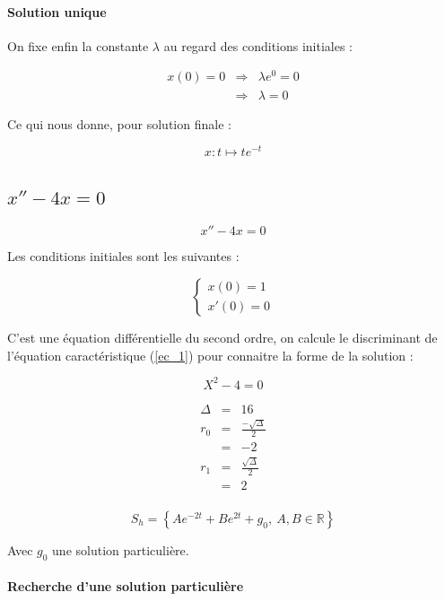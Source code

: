 \documentclass[a4paper, 11pt]{report} %
\newcommand{\R}{\mathbb{R}}
\renewcommand{\mapsto}{\longmapsto}
\begin{document}
\paragraph{Solution unique}
On fixe enfin la constante $\lambda$ au regard des conditions initiales :

\begin{eqnarray*}
    x(0) = 0 & \Rightarrow & \lambda e^0 = 0\\
    & \Rightarrow & \lambda = 0
\end{eqnarray*}

Ce qui nous donne, pour solution finale :

\[
x : t \mapsto te^{-t}
\]
\subsection{$x'' - 4x = 0$} %

\begin{equation}
x'' - 4x = 0
\label{equa_diff_2}
\end{equation}

Les conditions initiales sont les suivantes :

\[
\left\{\begin{array}{l}
x(0) = 1\\
x'(0) = 0
\end{array}\right.
\]

C'est une équation différentielle du second ordre, on calcule le discriminant de l'équation caractéristique (\ref{ec_1})
pour connaitre la forme de la solution :

\begin{equation}
X^2 - 4 = 0
\label{ec_1}
\end{equation}

\begin{eqnarray*}
    \Delta & = & 16\\
    r_0 & = & \frac{-\sqrt{\Delta}}{2}\\
    & = & -2\\
    r_1 & = & \frac{\sqrt{\Delta}}{2}\\
    & = & 2\\
\end{eqnarray*}

\[
S_h = \left\{Ae^{-2t} + Be^{2t} + g_0,~A,B\in\R\right\}
\]

Avec $g_0$ une solution particulière.

\paragraph{Recherche d'une solution particulière}
\end{document}
